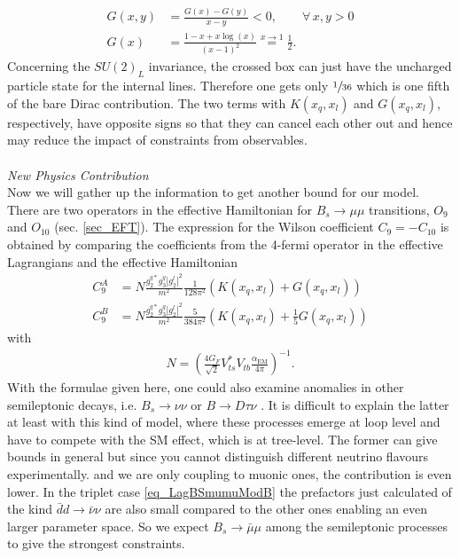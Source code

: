 \begin{align}
 G(x,y) &= \frac{G(x)-G(y)}{x-y} < 0,\qquad \forall\, x,y>0\\
 G(x)&=\frac{1-x+x\log(x)}{(x-1)^2} \stackrel{x\rightarrow 1}{=} \frac12.
\end{align}
Concerning the $SU(2)_L$ invariance, the crossed box can just have the uncharged particle state for the internal lines. Therefore one gets only $\sfrac{1}{36}$
which is one fifth of the bare Dirac contribution. The two terms with $K(x_q,x_l)$ and $G(x_q,x_l)$, respectively, have opposite signs so that they can cancel
each other out and hence may reduce the impact of constraints from observables.\\
\\ \textit{New Physics Contribution}\\
\noindent Now we will gather up the information to get another bound for our model. There are two operators in the effective Hamiltonian for $B_s\rightarrow \mu\mu$
transitions, $O_9$ and $O_{10}$ (sec. \ref{sec_EFT}). The expression for the Wilson coefficient $C_9 = -C_{10}$ \cite{1408.1627} is obtained by comparing the 
coefficients from the 4-fermi operator in the effective Lagrangians and the effective Hamiltonian
\begin{align}
 C_9^A &= N \frac{g_2^{q*}g_3^q|g_2^l|^2}{m^2} \frac{1}{128\pi^2} \left(K(x_q,x_l) + G(x_q,x_l)\right)\\
 C_9^B &= N \frac{g_2^{q*}g_3^q|g_2^l|^2}{m^2} \frac{5}{384\pi^2} \left(K(x_q,x_l) + \frac15 G(x_q,x_l)\right)
 \label{eq_WilsonBsmumu}
\end{align}
with
\begin{align}
 N = \left(\frac{4G_F}{\sqrt{2}} V_{ts}^*V_{tb} \frac{\alpha_\text{EM}}{4\pi}\right)^{-1}.
\end{align}
With the formulae given here, one could also examine anomalies in other semileptonic decays, i.e. $B_s \rightarrow \nu\nu$ \cite{1409.4557} or $B \rightarrow D\tau\nu$ \cite{1507.03233}. 
It is difficult to explain the latter at least with this kind of model, where these processes emerge at loop level and have to compete with the 
SM effect, which is at tree-level. The former can give bounds in general but since you cannot distinguish different neutrino flavours experimentally.
and we are only coupling to muonic ones, the contribution is even lower. In the triplet case \eqref{eq_LagBSmumuModB} the prefactors just calculated 
of the kind $\bar dd\rightarrow \bar\nu\nu$
are also small compared to the other ones enabling an even larger parameter space. So we expect $B_s\rightarrow \bar \mu \mu$ among the semileptonic
processes to give the strongest constraints.
 


%  
